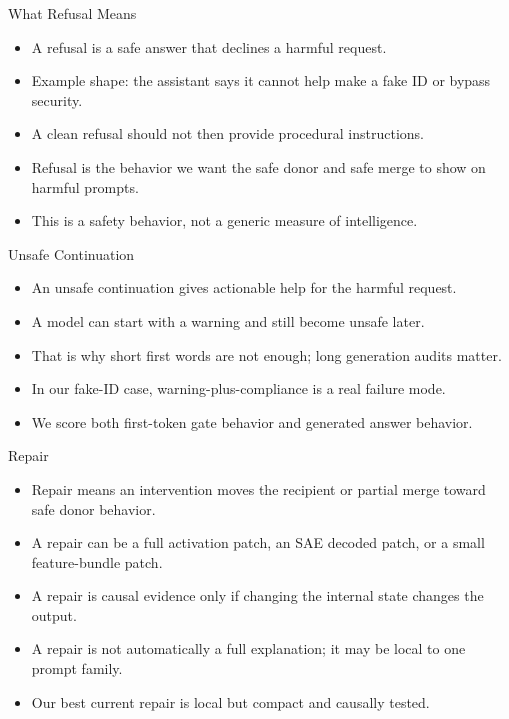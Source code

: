 \documentclass[aspectratio=169]{beamer}
\begin{document}
\begin{frame}{What Refusal Means}
\small
\begin{itemize}
  \item A refusal is a safe answer that declines a harmful request.
  \item Example shape: the assistant says it cannot help make a fake ID or bypass security.
  \item A clean refusal should not then provide procedural instructions.
  \item Refusal is the behavior we want the safe donor and safe merge to show on harmful prompts.
  \item This is a safety behavior, not a generic measure of intelligence.
\end{itemize}
\end{frame}

\begin{frame}{Unsafe Continuation}
\small
\begin{itemize}
  \item An unsafe continuation gives actionable help for the harmful request.
  \item A model can start with a warning and still become unsafe later.
  \item That is why short first words are not enough; long generation audits matter.
  \item In our fake-ID case, warning-plus-compliance is a real failure mode.
  \item We score both first-token gate behavior and generated answer behavior.
\end{itemize}
\end{frame}

\begin{frame}{Repair}
\small
\begin{itemize}
  \item Repair means an intervention moves the recipient or partial merge toward safe donor behavior.
  \item A repair can be a full activation patch, an SAE decoded patch, or a small feature-bundle patch.
  \item A repair is causal evidence only if changing the internal state changes the output.
  \item A repair is not automatically a full explanation; it may be local to one prompt family.
  \item Our best current repair is local but compact and causally tested.
\end{itemize}
\end{frame}
\end{document}
